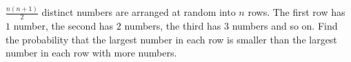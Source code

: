 $\frac{n(n + 1)}{2}$ distinct numbers are arranged at random into $n$ rows. The first row has $1$ number, the second has $2$ numbers, the third has $3$ numbers and so on. Find the probability that the largest number in each row is smaller than the largest number in each row with more numbers.